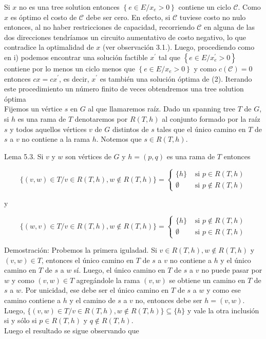 \documentclass[10pt]{article}
\begin{document}
Si $x$ no es una tree solution entonces $\left\{e \in E / x_{e}>0\right\}$ contiene un ciclo $\mathcal{C}$. Como $x$ es óptimo el costo de $\mathcal{C}$ debe ser cero. En efecto, si $\mathcal{C}$ tuviese costo no nulo entonces, al no haber restricciones de capacidad, recorriendo $\mathcal{C}$ en alguna de las dos direcciones tendríamos un circuito aumentativo de costo negativo, lo que contradice la optimalidad de $x$ (ver observación 3.1.). Luego, procediendo como en i) podemos encontrar una solución factible $x^{\prime}$ tal que $\left\{e \in E / x_{e}^{\prime}>0\right\}$ contiene por lo menos un ciclo menos que $\left\{e \in E / x_{e}>0\right\}$ y como $c(\mathcal{C})=0$ entonces $c x=c x^{\prime}$, es decir, $x^{\prime}$ es también una solución óptima de (2). Iterando este procedimiento un número finito de veces obtendremos una tree solution óptima\\
Fijemos un vértice $s$ en $G$ al que llamaremos raíz. Dado un spanning tree $T$ de $G$, si $h$ es una rama de $T$ denotaremos por $R(T, h)$ al conjunto formado por la raíz $s$ y todos aquellos vértices $v$ de $G$ distintos de $s$ tales que el único camino en $T$ de $s$ a $v$ no contiene a la rama $h$. Notemos que $s \in R(T, h)$.

Lema 5.3. Si $v$ y $w$ son vértices de $G$ y $h=(p, q)$ es una rama de $T$ entonces

$$
\{(v, w) \in T / v \in R(T, h), w \notin R(T, h)\}= \begin{cases}\{h\} & \text { si } p \in R(T, h) \\ \emptyset & \text { si } p \notin R(T, h)\end{cases}
$$

y

$$
\{(w, v) \in T / v \in R(T, h), w \notin R(T, h)\}= \begin{cases}\{h\} & \text { si } p \notin R(T, h) \\ \emptyset & \text { si } p \in R(T, h)\end{cases}
$$

Demostración: Probemos la primera iguladad. Si $v \in R(T, h), w \notin R(T, h)$ y $(v, w) \in T$, entonces el único camino en $T$ de $s$ a $v$ no contiene a $h$ y el único camino en $T$ de $s$ a $w$ sí. Luego, el único camino en $T$ de $s$ a $v$ no puede pasar por $w$ y como $(v, w) \in T$ agregándole la rama $(v, w)$ se obtiene un camino en $T$ de $s$ a $w$. Por unicidad, ese debe ser el único camino en $T$ de $s$ a $w$ y como ese camino contiene a $h$ y el camino de $s$ a $v$ no, entonces debe ser $h=(v, w)$.\\
Luego, $\{(v, w) \in T / v \in R(T, h), w \notin R(T, h)\} \subseteq\{h\}$ y vale la otra inclusión si y sólo si $p \in R(T, h)$ y $q \notin R(T, h)$.\\
Luego el resultado se sigue observando que
\end{document}
